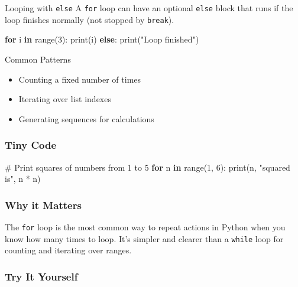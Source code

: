 \documentclass[
  letterpaper,
  DIV=11,
  numbers=noendperiod]{scrreprt}
\newenvironment{Shaded}{\begin{snugshade}}{\end{snugshade}}
\newcommand{\BuiltInTok}[1]{\textcolor[rgb]{0.00,0.23,0.31}{#1}}
\newcommand{\CommentTok}[1]{\textcolor[rgb]{0.37,0.37,0.37}{#1}}
\newcommand{\ControlFlowTok}[1]{\textcolor[rgb]{0.00,0.23,0.31}{\textbf{#1}}}
\newcommand{\DecValTok}[1]{\textcolor[rgb]{0.68,0.00,0.00}{#1}}
\newcommand{\KeywordTok}[1]{\textcolor[rgb]{0.00,0.23,0.31}{\textbf{#1}}}
\newcommand{\NormalTok}[1]{\textcolor[rgb]{0.00,0.23,0.31}{#1}}
\newcommand{\OperatorTok}[1]{\textcolor[rgb]{0.37,0.37,0.37}{#1}}
\newcommand{\StringTok}[1]{\textcolor[rgb]{0.13,0.47,0.30}{#1}}
\providecommand{\tightlist}{%
  \setlength{\itemsep}{0pt}\setlength{\parskip}{0pt}}
\begin{document}
Looping with \texttt{else} A \texttt{for} loop can have an optional
\texttt{else} block that runs if the loop finishes normally (not stopped
by \texttt{break}).

\begin{Shaded}
\begin{Highlighting}[]
\ControlFlowTok{for}\NormalTok{ i }\KeywordTok{in} \BuiltInTok{range}\NormalTok{(}\DecValTok{3}\NormalTok{):}
    \BuiltInTok{print}\NormalTok{(i)}
\ControlFlowTok{else}\NormalTok{:}
    \BuiltInTok{print}\NormalTok{(}\StringTok{"Loop finished"}\NormalTok{)}
\end{Highlighting}
\end{Shaded}

Common Patterns

\begin{itemize}
\tightlist
\item
  Counting a fixed number of times
\item
  Iterating over list indexes
\item
  Generating sequences for calculations
\end{itemize}

\subsubsection{Tiny Code}\label{tiny-code-18}

\begin{Shaded}
\begin{Highlighting}[]
\CommentTok{\# Print squares of numbers from 1 to 5}
\ControlFlowTok{for}\NormalTok{ n }\KeywordTok{in} \BuiltInTok{range}\NormalTok{(}\DecValTok{1}\NormalTok{, }\DecValTok{6}\NormalTok{):}
    \BuiltInTok{print}\NormalTok{(n, }\StringTok{"squared is"}\NormalTok{, n }\OperatorTok{*}\NormalTok{ n)}
\end{Highlighting}
\end{Shaded}

\subsubsection{Why it Matters}\label{why-it-matters-18}

The \texttt{for} loop is the most common way to repeat actions in Python
when you know how many times to loop. It's simpler and clearer than a
\texttt{while} loop for counting and iterating over ranges.

\subsubsection{Try It Yourself}\label{try-it-yourself-18}
\end{document}
